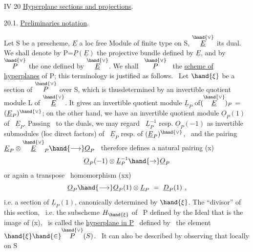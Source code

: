 IV 20 \quad \uline{Hyperplane sections and  projections}.

20.1. \quad \uline{Preliminaries  notation}.

Let S be a \quad prescheme, $\underline{E}$ a loc free Module of finite type on S,
$\overset{\hand{\vee}}{\underline{E}}$ its dual. We shall denote by P=$\underline{P}(\underline{E})$ the projective bundle defined by $\underline{E}$,
and by $\overset{\hand{\vee}}{P}$ the one defined by $\overset{\hand{\vee}}{\underline{E}}$. We shall  \ $\overset{\hand{\vee}}{P}$ \ the \uline{scheme of hyperplanes}
of P; this terminology is justified as follows. \ Let
$\hand{\xi}$ be a section of $\overset{\hand{\vee}}{P}$ over S, which is thus\hand{/}determined by an invertible
quotient module L of $\overset{\hand{\vee}}{\underline{E}}$. It gives an invertible quotient module
$\underline{L}_P$ of$(\overset{\hand{\vee}}{\underline{E}})_P$ = $(\underline{E}_P)^{\hand{\vee}}$; on the other hand, we have an invertible quotient module
$\underline{O}_P(1)$ of \ $\underline{E}_P$. Passing \ to the duals, we may regard \ $\underline{L}_P^{-1}$ resp. $\underline{O}_P(-1)$
as invertible submodules (loc direct factors) of \ $\underline{E}_P$ resp.
of $(\underline{E}_P)^{\hand{\vee}}$, \ and the pairing \ $\underline{E}_P \otimes \overset{\hand{\vee}}{\underline{E}}_P \hand{\longrightarrow} \underline{O}_P$ \ therefore defines a
natural pairing
(x) \[ \underline{O}_P(-1)\otimes\underline{L}_P^{-1} \hand{\to} \underline{O}_P \]
or again a transpose \ homomorphism
(xx) \[ \underline{O}_P \hand{\longrightarrow} \underline{O}_P(1)\otimes\underline{L}_P \ = \ \underline{D}_P(1) \ , \]
i.e. a section of $\underline{L}_P(1)$, canonically determined by $\hand{\xi}$. The ``divisor''
of this section, \ i.e. the  subscheme $H_{\hand{\xi}}$ of \ P defined by the Ideal
that is the image of (x), \ is called the \uline{hyperplane in P} \ defined by \ the element
$\hand{\xi} \hand{\in} \overset{\hand{\vee}}{P}(S)$. \ It can also be described by observing that locally on S 
